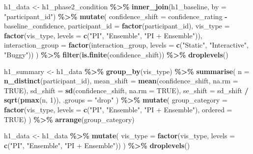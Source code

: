 \documentclass[
]{article}
\newenvironment{Shaded}{\begin{snugshade}}{\end{snugshade}}
\newcommand{\AttributeTok}[1]{\textcolor[rgb]{0.13,0.29,0.53}{#1}}
\newcommand{\ConstantTok}[1]{\textcolor[rgb]{0.56,0.35,0.01}{#1}}
\newcommand{\DecValTok}[1]{\textcolor[rgb]{0.00,0.00,0.81}{#1}}
\newcommand{\FunctionTok}[1]{\textcolor[rgb]{0.13,0.29,0.53}{\textbf{#1}}}
\newcommand{\NormalTok}[1]{#1}
\newcommand{\OtherTok}[1]{\textcolor[rgb]{0.56,0.35,0.01}{#1}}
\newcommand{\SpecialCharTok}[1]{\textcolor[rgb]{0.81,0.36,0.00}{\textbf{#1}}}
\newcommand{\StringTok}[1]{\textcolor[rgb]{0.31,0.60,0.02}{#1}}
\begin{document}
\begin{Shaded}
\begin{Highlighting}[]
\NormalTok{h1\_data }\OtherTok{\textless{}{-}}\NormalTok{ h1\_phase2\_condition }\SpecialCharTok{\%\textgreater{}\%}
  \FunctionTok{inner\_join}\NormalTok{(h1\_baseline, }\AttributeTok{by =} \StringTok{"participant\_id"}\NormalTok{) }\SpecialCharTok{\%\textgreater{}\%}
  \FunctionTok{mutate}\NormalTok{(}
    \AttributeTok{confidence\_shift =}\NormalTok{ confidence\_rating }\SpecialCharTok{{-}}\NormalTok{ baseline\_confidence,}
    \AttributeTok{participant\_id =} \FunctionTok{factor}\NormalTok{(participant\_id),}
    \AttributeTok{vis\_type =} \FunctionTok{factor}\NormalTok{(vis\_type, }\AttributeTok{levels =} \FunctionTok{c}\NormalTok{(}\StringTok{"PI"}\NormalTok{, }\StringTok{"Ensemble"}\NormalTok{, }\StringTok{"PI + Ensemble"}\NormalTok{)),}
    \AttributeTok{interaction\_group =} \FunctionTok{factor}\NormalTok{(interaction\_group, }\AttributeTok{levels =} \FunctionTok{c}\NormalTok{(}\StringTok{"Static"}\NormalTok{, }\StringTok{"Interactive"}\NormalTok{, }\StringTok{"Buggy"}\NormalTok{))}
\NormalTok{  ) }\SpecialCharTok{\%\textgreater{}\%}
  \FunctionTok{filter}\NormalTok{(}\FunctionTok{is.finite}\NormalTok{(confidence\_shift)) }\SpecialCharTok{\%\textgreater{}\%}
  \FunctionTok{droplevels}\NormalTok{()}

\NormalTok{h1\_summary }\OtherTok{\textless{}{-}}\NormalTok{ h1\_data }\SpecialCharTok{\%\textgreater{}\%}
  \FunctionTok{group\_by}\NormalTok{(vis\_type) }\SpecialCharTok{\%\textgreater{}\%}
  \FunctionTok{summarise}\NormalTok{(}
    \AttributeTok{n =} \FunctionTok{n\_distinct}\NormalTok{(participant\_id),}
    \AttributeTok{mean\_shift =} \FunctionTok{mean}\NormalTok{(confidence\_shift, }\AttributeTok{na.rm =} \ConstantTok{TRUE}\NormalTok{),}
    \AttributeTok{sd\_shift =} \FunctionTok{sd}\NormalTok{(confidence\_shift, }\AttributeTok{na.rm =} \ConstantTok{TRUE}\NormalTok{),}
    \AttributeTok{se\_shift =}\NormalTok{ sd\_shift }\SpecialCharTok{/} \FunctionTok{sqrt}\NormalTok{(}\FunctionTok{pmax}\NormalTok{(n, }\DecValTok{1}\NormalTok{)),}
    \AttributeTok{.groups =} \StringTok{"drop"}
\NormalTok{  ) }\SpecialCharTok{\%\textgreater{}\%}
  \FunctionTok{mutate}\NormalTok{(}
    \AttributeTok{group\_category =} \FunctionTok{factor}\NormalTok{(vis\_type, }\AttributeTok{levels =} \FunctionTok{c}\NormalTok{(}\StringTok{"PI"}\NormalTok{, }\StringTok{"Ensemble"}\NormalTok{, }\StringTok{"PI + Ensemble"}\NormalTok{), }\AttributeTok{ordered =} \ConstantTok{TRUE}\NormalTok{)}
\NormalTok{  ) }\SpecialCharTok{\%\textgreater{}\%}
  \FunctionTok{arrange}\NormalTok{(group\_category)}

\NormalTok{h1\_data }\OtherTok{\textless{}{-}}\NormalTok{ h1\_data }\SpecialCharTok{\%\textgreater{}\%}
  \FunctionTok{mutate}\NormalTok{(}
    \AttributeTok{vis\_type =} \FunctionTok{factor}\NormalTok{(vis\_type, }\AttributeTok{levels =} \FunctionTok{c}\NormalTok{(}\StringTok{"PI"}\NormalTok{, }\StringTok{"Ensemble"}\NormalTok{, }\StringTok{"PI + Ensemble"}\NormalTok{))}
\NormalTok{  ) }\SpecialCharTok{\%\textgreater{}\%}
  \FunctionTok{droplevels}\NormalTok{()}
\end{Highlighting}
\end{Shaded}
\end{document}
